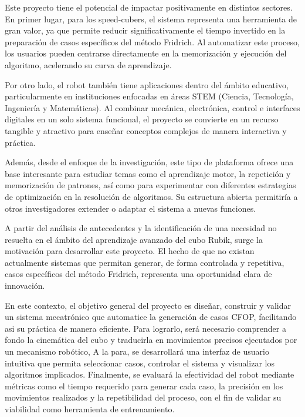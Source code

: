 Este proyecto tiene el potencial de impactar positivamente en distintos sectores. En primer lugar, para los speed-cubers, el sistema representa una herramienta de gran valor, ya que permite reducir significativamente el tiempo invertido en la preparación de casos específicos del método Fridrich. Al automatizar este proceso, los usuarios pueden centrarse directamente en la memorización y ejecución del algoritmo, acelerando su curva de aprendizaje.

Por otro lado, el robot también tiene aplicaciones dentro del ámbito educativo, particularmente en instituciones enfocadas en áreas STEM (Ciencia, Tecnología, Ingeniería y Matemáticas). Al combinar mecánica, electrónica, control e interfaces digitales en un solo sistema funcional, el proyecto se convierte en un recurso tangible y atractivo para enseñar conceptos complejos de manera interactiva y práctica. 

Además, desde el enfoque de la investigación, este tipo de plataforma ofrece una base interesante para estudiar temas como el aprendizaje motor, la repetición y memorización de patrones, así como para experimentar con diferentes estrategias de optimización en la resolución de algoritmos. Su estructura abierta permitiría a otros investigadores extender o adaptar el sistema a nuevas funciones. 

A partir del análisis de antecedentes y la identificación de una necesidad no resuelta en el ámbito del aprendizaje avanzado del cubo Rubik, surge la motivación para desarrollar este proyecto. El hecho de que no existan actualmente sistemas que permitan generar, de forma controlada y repetitiva, casos específicos del método Fridrich, representa una oportunidad clara de innovación.

En este contexto, el objetivo general del proyecto es diseñar, construir y validar un sistema mecatrónico que automatice la generación de casos CFOP, facilitando asi su práctica de manera eficiente. Para lograrlo, será necesario comprender a fondo la cinemática del cubo y traducirla en movimientos precisos ejecutados por un mecanismo robótico, A la para, se desarrollará una interfaz de usuario intuitiva que permita seleccionar casos, controlar el sistema y visualizar los algoritmos implicados. Finalmente, se evaluará la efectividad del robot mediante métricas como el tiempo requerido para generar cada caso, la precisión en los movimientos realizados y la repetibilidad del proceso, con el fin de validar su viabilidad como herramienta de entrenamiento. 